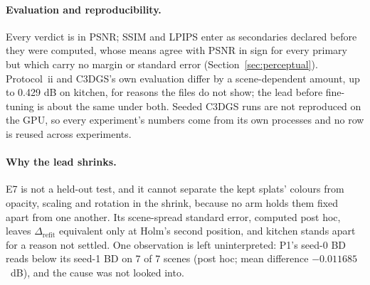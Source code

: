 \paragraph{Evaluation and reproducibility.}
Every verdict is in PSNR; SSIM and LPIPS enter as secondaries declared before they were computed, whose means agree with PSNR in sign for every primary but which carry no margin or standard error (Section~\ref{sec:perceptual}). %
Protocol~ii and C3DGS's own evaluation differ by a scene-dependent amount, up to 0.429 dB on kitchen, for reasons the files do not show; the lead before fine-tuning is about the same under both. %
Seeded C3DGS runs are not reproduced on the GPU, so every experiment's numbers come from its own processes and no row is reused across experiments. %

\paragraph{Why the lead shrinks.}
E7 is not a held-out test, and it cannot separate the kept splats' colours from opacity, scaling and rotation in the shrink, because no arm holds them fixed apart from one another. %
Its scene-spread standard error, computed post hoc, leaves $\Delta_{\mathrm{refit}}$ equivalent only at Holm's second position, and kitchen stands apart for a reason not settled. %
One observation is left uninterpreted: P1's seed-0 BD reads below its seed-1 BD on 7 of 7 scenes (post hoc; mean difference $-0.011685$~dB), and the cause was not looked into. %
